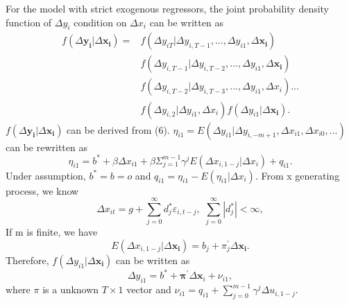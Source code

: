 \documentclass[12pt,a4paper,hyperref]{article}
\begin{document}
For the model with strict exogenous regressors, the joint probability density function of $\Delta y_{i}$ condition on $\Delta x_{i}$ can be written as
\begin{equation}
\begin{split}
f(\Delta \boldsymbol{y_{i}}|\Delta \boldsymbol{x_{i}})=&f(\Delta y_{iT}|\Delta y_{i,T-1},...,\Delta y_{i1}, \Delta \boldsymbol{x_{i}}) \\
& f(\Delta y_{i,T-1}|\Delta y_{i,T-2},...,\Delta y_{i1}, \Delta \boldsymbol{x_{i}})  \\
& f(\Delta y_{i,T-2}|\Delta y_{i,T-3},...,\Delta y_{i1}, \Delta x_{i})...  \\
& f(\Delta y_{i,2}|\Delta y_{i1}, \Delta x_{i})f(\Delta y_{i1}|\Delta \boldsymbol{x_{i}}).
\end{split}
\end{equation}
$f(\Delta \boldsymbol{y_{i}}|\Delta \boldsymbol{x_{i}})$
can be derived from (6).
$\eta_{i1}= E(\Delta y_{i1}|\Delta y_{i,-m+1},\Delta x_{i1}, \Delta x_{i0},...)$ can be rewritten as
\begin{equation}
 \eta_{i1}=b^{\ast}+\beta \Delta x_{i1}+\beta \Sigma^{m-1}_{j=1}\gamma^{j}E(\Delta x_{i,1-j}|\Delta x_{i})+q_{i1}.
 \end{equation}
Under assumption, $b^{\ast}=b=o$ and $q_{i1}=\eta_{i1}-E(\eta_{i1}|\Delta x_{i}).$
From x generating process, we know
\begin{equation}
\Delta x_{it}=g+\sum^{\infty}_{j=0}d^{\ast}_{j}\varepsilon_{i,t-j}, \, \,  \sum^{\infty}_{j=0}|d^{\ast}_{j}|<\infty,
\end{equation}
If m is finite, we have
\begin{equation}
E(\Delta x_{i,1-j}|\Delta \boldsymbol{x_{i}})=b_{j}+\pi^{'}_{j}\Delta \boldsymbol{x_{i}}.
\end{equation}
Therefore, $f(\Delta y_{i1}|\Delta \boldsymbol{x_{i}})$ can be written as
\begin{equation}
\Delta y_{i1}=b^{\ast}+\boldsymbol{\pi}^{'}\Delta \boldsymbol{x}_{i}+\nu_{i1},
\end{equation}
where $\pi$ is a unknown $T\times1$ vector and $\nu_{i1}=q_{i1}+\sum^{m-1}_{j=0}\gamma^{j}\Delta u_{i,1-j}.$ \\
\end{document}
